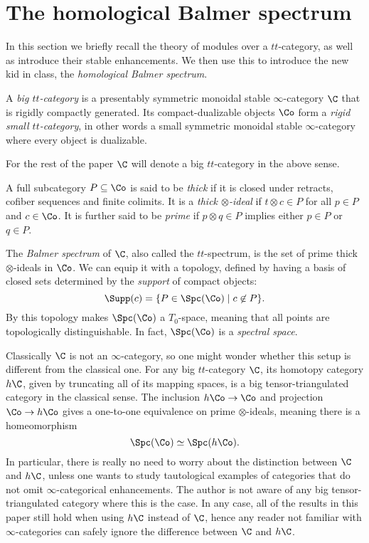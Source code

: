 
\section{The homological Balmer spectrum}
\label{sec:homological-Balmer-spectrum}

In this section we briefly recall the theory of modules over a $tt$-category, as well as introduce their stable enhancements. We then use this to introduce the new kid in class, the \emph{homological Balmer spectrum}. 

\begin{definition}
    A \emph{big $tt$-category} is a presentably symmetric monoidal stable $\infty$-category $\C$ that is rigidly compactly generated. Its compact-dualizable objects $\Co$ form a \emph{rigid small $tt$-category}, in other words a small symmetric monoidal stable $\infty$-category where every object is dualizable. 
\end{definition}

For the rest of the paper $\C$ will denote a big $tt$-category in the above sense.

\begin{definition}
    A full subcategory $P\subseteq \Co$ is said to be \emph{thick} if it is closed under retracts, cofiber sequences and finite colimits. It is a \emph{thick $\otimes$-ideal} if $t\otimes c\in P$ for all $p\in P$ and $c\in \Co$. It is further said to be \emph{prime} if $p\otimes q \in P$ implies either $p\in P$ or $q\in P$. 
\end{definition}

The \emph{Balmer spectrum} of $\C$, also called the $tt$-spectrum, is the set of prime thick $\otimes$-ideals in $\Co$. We can equip it with a topology, defined by having a basis of closed sets determined by the \emph{support} of compact objects: 
\[\Supp(c)= \{P\in \Spc(\Co)\mid c\not\in P\}.\]
By \cite[2.9]{balmer_2005} this topology makes $\Spc(\Co)$ a $T_0$-space, meaning that all points are topologically distinguishable. In fact, $\Spc(\Co)$ is a \emph{spectral space}. 

\begin{remark}
    \label{rm:homotopy-category-spectrum}
    Classically $\C$ is not an $\infty$-category, so one might wonder whether this setup is different from the classical one. For any big $tt$-category $\C$, its homotopy category $h\C$, given by truncating all of its mapping spaces, is a big tensor-triangulated category in the classical sense. The inclusion $h\Co\to \Co$ and projection $\Co \to h\Co$ gives a one-to-one equivalence on prime $\otimes$-ideals, meaning there is a homeomorphism
    \[\Spc(\Co)\simeq \Spc(h\Co).\]
    In particular, there is really no need to worry about the distinction between $\C$ and $h\C$, unless one wants to study tautological examples of categories that do not omit $\infty$-categorical enhancements. The author is not aware of any big tensor-triangulated category where this is the case. In any case, all of the results in this paper still hold when using $h\C$ instead of $\C$, hence any reader not familiar with $\infty$-categories can safely ignore the difference between $\C$ and $h\C$. 
\end{remark}



